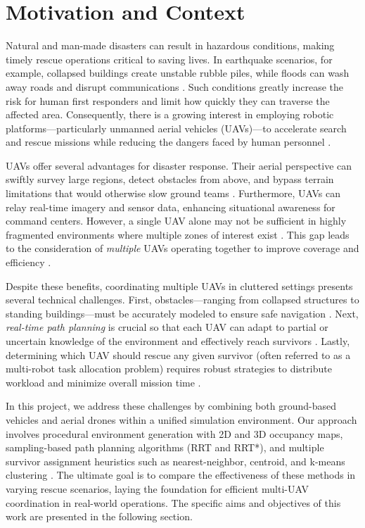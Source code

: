 \documentclass[12pt,a4paper]{report}
\begin{document}
\section{Motivation and Context}
\label{sec:motivationandcontext}
Natural and man-made disasters can result in hazardous conditions,
making timely rescue operations critical to saving lives. In earthquake
scenarios, for example, collapsed buildings create unstable rubble piles,
while floods can wash away roads and disrupt communications \cite{Auclair2021CollapseRisk,Daud2022DroneDisaster}.
Such conditions greatly increase the risk for human first responders and limit how quickly
they can traverse the affected area. Consequently,
there is a growing interest in employing robotic platforms—particularly
unmanned aerial vehicles (UAVs)—to accelerate search and rescue missions
while reducing the dangers faced by human personnel \cite{Erdelj2017MultiUAV}.

UAVs offer several advantages for disaster response. Their aerial perspective
can swiftly survey large regions, detect obstacles from above, and bypass terrain
limitations that would otherwise slow ground teams \cite{Merei2025UAVObstacleSurvey}. Furthermore,
UAVs can relay real-time imagery and sensor data, enhancing situational awareness
for command centers. However, a single UAV alone may not be sufficient in highly
fragmented environments where multiple zones of interest exist \cite{Erdelj2017MultiUAV}. This gap leads to
the consideration of \emph{multiple} UAVs operating together to improve coverage
and efficiency \cite{Daud2022DroneDisaster}.

Despite these benefits, coordinating multiple UAVs in cluttered settings
presents several technical challenges. 
First, obstacles—ranging from collapsed
structures to standing buildings—must be accurately modeled to ensure safe
navigation \cite{Merei2025UAVObstacleSurvey}.
Next, \emph{real-time path planning} is crucial so that each UAV can adapt to partial
or uncertain knowledge of the environment and effectively reach survivors
\cite{Oleynikova2018ReplanDynamic,Zhang2024ShrinkingPOMCP}. Lastly, determining
which UAV should rescue any given survivor (often referred to as a multi-robot task
allocation problem) requires robust strategies to distribute workload and minimize
overall mission time \cite{Gerkey2004Taxonomy}.

In this project, we address these challenges by combining both ground-based
vehicles and aerial drones within a unified simulation environment. Our approach
involves procedural environment generation with 2D and 3D occupancy maps, sampling-based
path planning algorithms (RRT and RRT*), and multiple survivor assignment heuristics
such as nearest-neighbor, centroid, and k-means clustering \cite{Orthey2024SBMPReview,LaValle2001RRT,Karaman2011RRTstar,Ghassemi2021NearestNeighbor,Ho2016CentroidAssign}.
The ultimate goal is to
compare the effectiveness of these methods in varying rescue scenarios, laying the
foundation for efficient multi-UAV coordination in real-world operations. The specific
aims and objectives of this work are presented in the following section.
\end{document}
